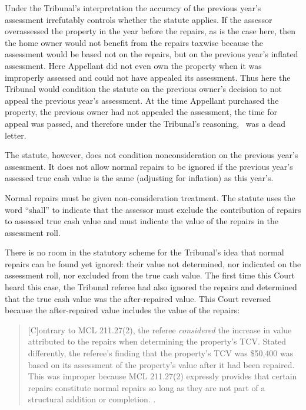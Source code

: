 \documentclass[12pt,\documentclassflag]{michiganCourtOfAppealsBrief}
\begin{document}
Under the Tribunal's interpretation the accuracy of the previous year's assessment irrefutably controls whether the statute applies. If the assessor overassessed the property in the year before the repairs, as is the case here, then the home owner would not benefit from the repairs taxwise because the assessment would be based not on the repairs, but on the previous year's inflated assessment. Here Appellant did not even own the property when it was improperly assessed and could not have appealed its assessment. Thus here the Tribunal would condition the statute on the previous owner's decision to not appeal the previous year's assessment. At the time Appellant purchased the property, the previous owner had not appealed the assessment, the time for appeal was passed, and therefore under the Tribunal's reasoning, \mathieuGast\ was a dead letter.

The statute, however, does not condition nonconsideration on the previous year's assessment. It does not allow normal repairs to be ignored if the previous year's assessed true cash value is the same (adjusting for inflation) as this year's.

Normal repairs must be given non-consideration treatment. The statute uses the word ``shall'' to indicate that the assessor must exclude the contribution of repairs to assessed true cash value and must indicate the value of the repairs in the assessment roll.

There is no room in the statutory scheme for the Tribunal's idea that normal repairs can be found yet ignored: their value not determined, nor indicated on the assessment roll, nor excluded from the true cash value.
The first time this Court heard this case, the Tribunal referee had also ignored the repairs and determined that the true cash value was the after-repaired value. This Court reversed because the after-repaired value includes the value of the repairs:

\begin{quote}
[C]ontrary to MCL 211.27(2), the referee {\em considered} the increase in value attributed to the repairs when determining the property's TCV. Stated differently, the referee's finding that the property's TCV was \$50,400 was based on its assessment of the property's value after it had been repaired. This was improper because MCL 211.27(2) expressly provides that certain repairs constitute normal repairs so long as they are not part of a structural addition or completion. .
\end{quote}
\end{document}
